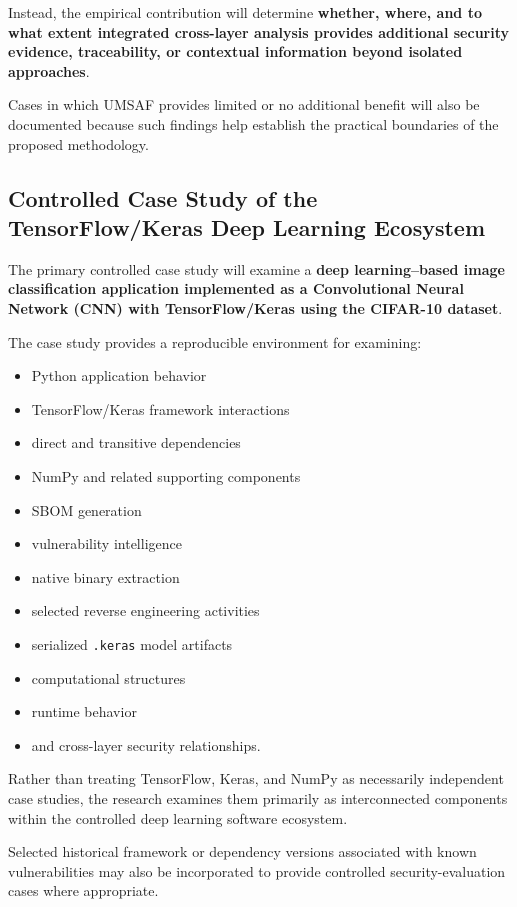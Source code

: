 \documentclass[
  12pt,
  letterpaper,
  oneside]{report}
\providecommand{\tightlist}{%
  \setlength{\itemsep}{0pt}\setlength{\parskip}{0pt}}
\begin{document}
Instead, the empirical contribution will determine \textbf{whether,
where, and to what extent integrated cross-layer analysis provides
additional security evidence, traceability, or contextual information
beyond isolated approaches}.

Cases in which UMSAF provides limited or no additional benefit will also
be documented because such findings help establish the practical
boundaries of the proposed methodology.

\subsection{Controlled Case Study of the TensorFlow/Keras Deep Learning Ecosystem}\label{1233-controlled-case-study-of-the-tensorflowkeras-deep-learning-ecosystem}

The primary controlled case study will examine a \textbf{deep
learning--based image classification application implemented as a
Convolutional Neural Network (CNN) with TensorFlow/Keras using the
CIFAR-10 dataset}.

The case study provides a reproducible environment for examining:

\begin{itemize}
\tightlist
\item
  Python application behavior
\item
  TensorFlow/Keras framework interactions
\item
  direct and transitive dependencies
\item
  NumPy and related supporting components
\item
  SBOM generation
\item
  vulnerability intelligence
\item
  native binary extraction
\item
  selected reverse engineering activities
\item
  serialized \texttt{.keras} model artifacts
\item
  computational structures
\item
  runtime behavior
\item
  and cross-layer security relationships.
\end{itemize}

Rather than treating TensorFlow, Keras, and NumPy as necessarily
independent case studies, the research examines them primarily as
interconnected components within the controlled deep learning software
ecosystem.

Selected historical framework or dependency versions associated with
known vulnerabilities may also be incorporated to provide controlled
security-evaluation cases where appropriate.
\end{document}

